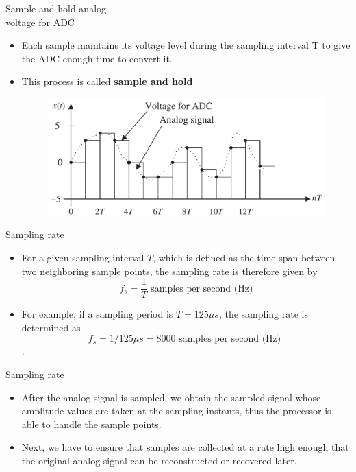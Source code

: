 \documentclass[pdflatex,compress,mathserif]{beamer}
\begin{document}
\begin{frame}{Sample-and-hold analog\\voltage for ADC}
    \begin{itemize}
        \item Each sample maintains its voltage level during the sampling interval T to give
        the ADC enough time to convert it.
        \item This process is called \textbf{sample and hold}
        \begin{figure}
            \includegraphics[width=0.9\linewidth]{./img/img03.png}
        \end{figure}
    \end{itemize}
\end{frame}

\begin{frame}{Sampling rate}
    \begin{itemize}
        \item For a given sampling interval $T$, which is defined as the time span between two neighboring sample points, the sampling rate is therefore given by
        \begin{equation*}
            f_s = \frac{1}{T} \text{ samples per second (Hz)}
        \end{equation*}
        \item For example, if a sampling period is $T = 125 \mu s$, the sampling rate is determined as $$f_s = 1/125 \mu s = 8000 \text{ samples per second (Hz) }$$ .
    \end{itemize}
\end{frame}

\begin{frame}{Sampling rate}
    \begin{itemize}
        \item After the analog signal is sampled, we obtain the sampled signal whose amplitude values are taken at the sampling instants, thus the processor is able to handle the sample points.
        \item  Next, we have to ensure that samples are collected at a rate high enough that the original analog signal can be reconstructed or recovered later.
    \end{itemize}    
\end{frame}
\end{document}
